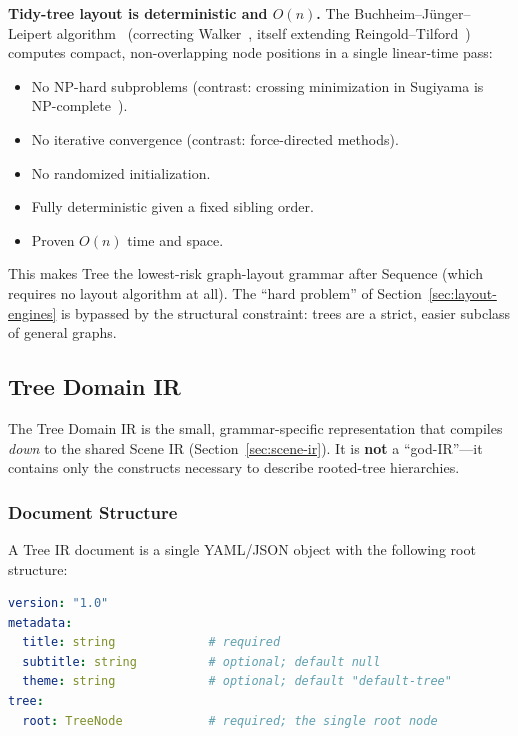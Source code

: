 \textbf{Tidy-tree layout is deterministic and $O(n)$.} The Buchheim--J{\"u}nger--Leipert algorithm~\cite{buchheim2002} (correcting Walker~\cite{walker1990}, itself extending Reingold--Tilford~\cite{reingold1981}) computes compact, non-overlapping node positions in a single linear-time pass:

\begin{itemize}
  \item No NP-hard subproblems (contrast: crossing minimization in Sugiyama is NP-complete~\cite{garey1983}).
  \item No iterative convergence (contrast: force-directed methods).
  \item No randomized initialization.
  \item Fully deterministic given a fixed sibling order.
  \item Proven $O(n)$ time and space.
\end{itemize}

This makes Tree the lowest-risk graph-layout grammar after Sequence (which requires no layout algorithm at all). The ``hard problem'' of Section~\ref{sec:layout-engines} is bypassed by the structural constraint: trees are a strict, easier subclass of general graphs.

\subsection{Tree Domain IR}
\label{sec:tree-domain-ir}

The Tree Domain IR is the small, grammar-specific representation that compiles \emph{down} to the shared Scene IR (Section~\ref{sec:scene-ir}). It is \textbf{not} a ``god-IR''---it contains only the constructs necessary to describe rooted-tree hierarchies.

\subsubsection{Document Structure}

A Tree IR document is a single YAML/JSON object with the following root structure:

\begin{lstlisting}[language=yaml,caption={Tree IR root document structure}]
version: "1.0"
metadata:
  title: string             # required
  subtitle: string          # optional; default null
  theme: string             # optional; default "default-tree"
tree:
  root: TreeNode            # required; the single root node
\end{lstlisting}

